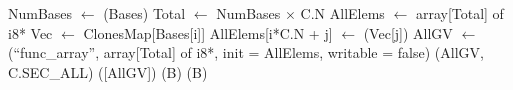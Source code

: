 \begin{algorithm}[H]
\caption{Phase H — Finalize and Publish Catalog}
\label{alg:phaseH}
\begin{algorithmic}[1]
\State NumBases $\gets$ (Bases)
\State Total    $\gets$ NumBases $\times$ C.N
\State AllElems $\gets$ array[Total] of i8*
  \State Vec $\gets$ ClonesMap[Bases[i]]
    \State AllElems[i*C.N + j] $\gets$ (Vec[j])
  \EndFor
\EndFor
\State AllGV $\gets$ (``func\_array'', array[Total] of i8*, init = AllElems, writable = false)
  \State {}(AllGV, C.SEC\_ALL)
\EndIf
\State {}([AllGV])
    \State {}(B)
  \Else
    \State {}(B)
  \EndIf
\EndFor
\end{algorithmic}
\end{algorithm}
\clearpage

